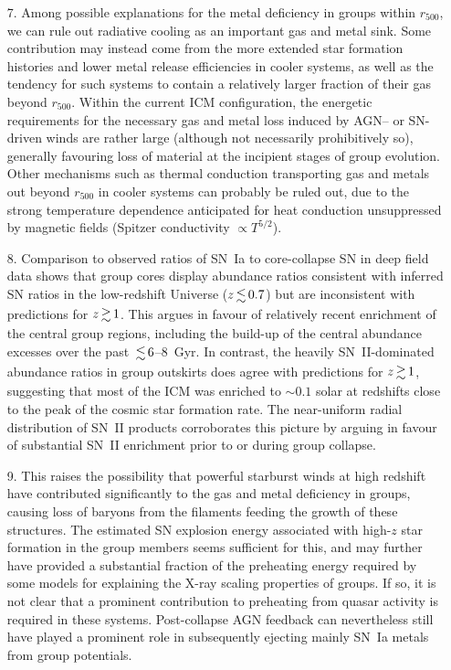 \documentclass[useAMS,usenatbib]{mn2e}
\begin{document}
\begin{enumerate}
\item[7.] Among possible explanations for the metal deficiency in
  groups within $r_{500}$, we can rule out radiative cooling as an
  important gas and metal sink. Some contribution may instead come
  from the more extended star formation histories and lower metal
  release efficiencies in cooler systems, as well as the tendency for
  such systems to contain a relatively larger fraction of their gas
  beyond $r_{500}$. Within the current ICM configuration, the
  energetic requirements for the necessary gas and metal loss induced
  by AGN-- or SN-driven winds are rather large (although not
  necessarily prohibitively so), generally favouring loss of material
  at the incipient stages of group evolution. Other mechanisms such as
  thermal conduction transporting gas and metals out beyond $r_{500}$
  in cooler systems can probably be ruled out, due to the strong
  temperature dependence anticipated for heat conduction unsuppressed
  by magnetic fields (Spitzer conductivity $\propto T^{5/2}$).

\item[8.] Comparison to observed ratios of SN~Ia to core-collapse SN
  in deep field data \citep{dahl04} shows that group cores display
  abundance ratios consistent with inferred SN ratios in the
  low-redshift Universe ($z\la 0.7$) but are inconsistent with
  predictions for $z\ga 1$. This argues in favour of relatively recent
  enrichment of the central group regions, including the build-up of
  the central abundance excesses over the past $\la 6$--8~Gyr. In
  contrast, the heavily SN~II-dominated abundance ratios in group
  outskirts does agree with predictions for $z\ga 1$, suggesting that
  most of the ICM was enriched to $\sim 0.1$ solar at redshifts close
  to the peak of the cosmic star formation rate. The near-uniform
  radial distribution of SN~II products corroborates this picture by
  arguing in favour of substantial SN~II enrichment prior to or during
  group collapse.

\item[9.] This raises the possibility that powerful starburst winds at
  high redshift have contributed significantly to the gas and metal
  deficiency in groups, causing loss of baryons from the filaments
  feeding the growth of these structures. The estimated SN explosion
  energy associated with high-$z$ star formation in the group members
  seems sufficient for this, and may further have provided a
  substantial fraction of the preheating energy required by some
  models for explaining the X-ray scaling properties of groups. If so,
  it is not clear that a prominent contribution to preheating from
  quasar activity is required in these systems. Post-collapse AGN
  feedback can nevertheless still have played a prominent role in
  subsequently ejecting mainly SN~Ia metals from group potentials.


\end{enumerate}
\end{document}
